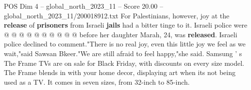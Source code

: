 \begin{textsample}{POS Dim 4 – global\_north\_2023\_11 – Score 20.00 – global\_north\_2023\_11/200018912.txt}
For Palestinians, however, joy at the \textbf{release} of \textbf{prisoners} from Israeli \textbf{jails} had a bitter tinge to it.
Israeli police were @ @ @ @ @ @ @ @ @ @ before her daughter Marah, 24, was \textbf{released}.
Israeli police declined to comment."There is no real joy, even this little joy we feel as we wait,"said Sawsan Bkeer."We are still afraid to feel happy,"she said.
Samsung ' s The Frame TVs are on sale for Black Friday, with discounts on every size model.
The Frame blends in with your home decor, displaying art when its not being used as a TV.
It comes in seven sizes, from 32-inch to 85-inch.

\end{textsample}
